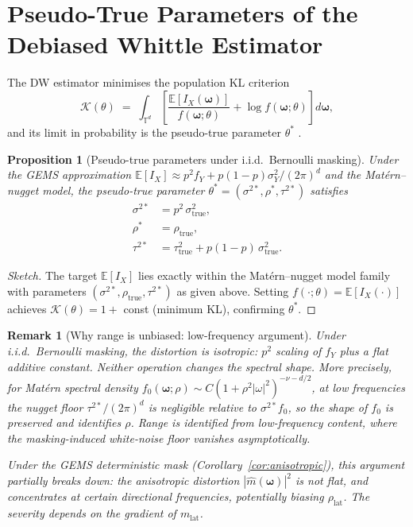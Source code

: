 \documentclass[12pt]{article}
\newtheorem{proposition}{Proposition}
\newtheorem{remark}{Remark}
\begin{document}
\section{Pseudo-True Parameters of the Debiased Whittle Estimator}
\label{sec:pseudo}

The DW estimator minimises the population KL criterion
\[
    \mathcal{K}(\theta)
    \;=\; \int_{\mathbb{T}^d} \left[
        \frac{\mathbb{E}[I_X(\boldsymbol{\omega})]}{f(\boldsymbol{\omega};\theta)}
        + \log f(\boldsymbol{\omega};\theta)
    \right] d\boldsymbol{\omega},
\]
and its limit in probability is the pseudo-true parameter $\theta^*$
\citep{White1982}.

\begin{proposition}[Pseudo-true parameters under i.i.d.\ Bernoulli masking]
\label{prop:pseudo}
Under the GEMS approximation $\mathbb{E}[I_X]
\approx p^2 f_Y + p(1-p)\sigma^2_Y/(2\pi)^d$
and the Matérn--nugget model, the pseudo-true parameter
$\theta^* = (\sigma^{2*}, \rho^*, \tau^{2*})$ satisfies
\begin{align}
  \sigma^{2*} &= p^2\,\sigma^2_{\mathrm{true}},
  \label{eq:sigma_bias} \\[4pt]
  \rho^* &= \rho_{\mathrm{true}},
  \label{eq:range_unbias} \\[4pt]
  \tau^{2*} &= \tau^2_{\mathrm{true}}
               + p(1-p)\,\sigma^2_{\mathrm{true}}.
  \label{eq:nugget_bias}
\end{align}
\end{proposition}

\begin{proof}[Sketch]
The target $\mathbb{E}[I_X]$ lies exactly within the Matérn--nugget model
family with parameters $(\sigma^{2*}, \rho_{\mathrm{true}}, \tau^{2*})$
as given above.  Setting $f(\cdot;\theta) = \mathbb{E}[I_X(\cdot)]$
achieves $\mathcal{K}(\theta) = 1 + $ const (minimum KL), confirming $\theta^*$.
\end{proof}

\begin{remark}[Why range is unbiased: low-frequency argument]
\label{rem:range_unbiased}
Under i.i.d.\ Bernoulli masking, the distortion is isotropic:
$p^2$ scaling of $f_Y$ plus a flat additive constant.
Neither operation changes the spectral shape.
More precisely, for Matérn spectral density
$f_0(\boldsymbol{\omega};\rho) \sim C(1 + \rho^2|\omega|^2)^{-\nu-d/2}$,
at low frequencies the nugget floor $\tau^{2*}/(2\pi)^d$ is negligible
relative to $\sigma^{2*} f_0$, so the shape of $f_0$ is
preserved and identifies $\rho$.
\textit{Range is identified from low-frequency content, where the
masking-induced white-noise floor vanishes asymptotically.}

Under the GEMS deterministic mask (Corollary~\ref{cor:anisotropic}),
this argument partially breaks down: the anisotropic distortion
$|\hat{m}(\boldsymbol{\omega})|^2$ is not flat, and concentrates at
certain directional frequencies, potentially biasing $\rho_{\mathrm{lat}}$.
The severity depends on the gradient of $m_{\mathrm{lat}}$.
\end{remark}
\end{document}
